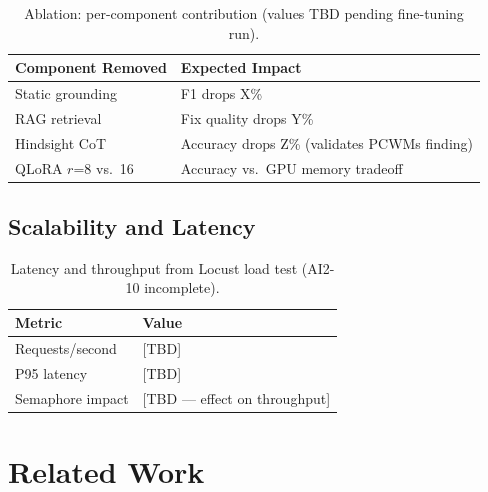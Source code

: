 \documentclass[11pt]{article}
\begin{document}
\begin{table}[ht]
  \centering
  \caption{Ablation: per-component contribution (values TBD pending fine-tuning run).}
  \label{tab:ablation}
  \begin{tabular}{@{}lp{8cm}@{}}
    \toprule
    \textbf{Component Removed} & \textbf{Expected Impact} \\
    \midrule
    Static grounding    & F1 drops X\% \\
    RAG retrieval       & Fix quality drops Y\% \\
    Hindsight CoT       & Accuracy drops Z\% (validates PCWMs finding) \\
    QLoRA $r$=8 vs.\ 16 & Accuracy vs.\ GPU memory tradeoff \\
    \bottomrule
  \end{tabular}
\end{table}

\subsection{Scalability and Latency}
\label{sec:eval:latency}

\begin{table}[ht]
  \centering
  \caption{Latency and throughput from Locust load test (AI2-10 incomplete).}
  \label{tab:latency}
  \begin{tabular}{@{}ll@{}}
    \toprule
    \textbf{Metric} & \textbf{Value} \\
    \midrule
    Requests/second  & [TBD] \\
    P95 latency      & [TBD] \\
    Semaphore impact & [TBD --- effect on throughput] \\
    \bottomrule
  \end{tabular}
\end{table}

\section{Related Work}
\label{sec:related}
\end{document}
